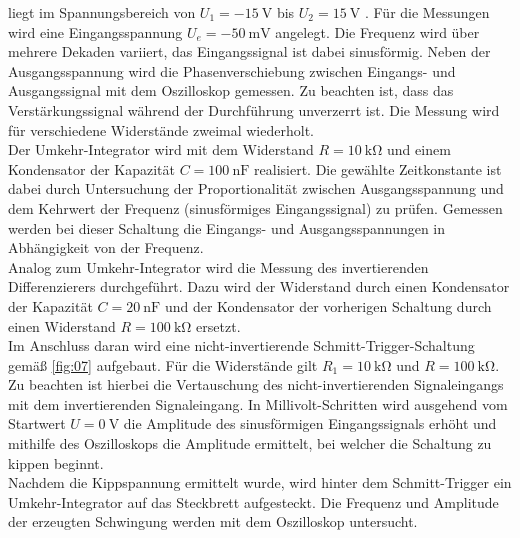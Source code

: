 liegt im Spannungsbereich von $U_1 = -\SI{15}{\volt}$ bis $U_2 = \SI{15}{\volt}$
\cite{datenblatt}. Für die Messungen wird eine Eingangsspannung
$U_e = -\SI{50}{\milli\volt}$ angelegt. Die Frequenz wird über mehrere Dekaden
variiert, das Eingangssignal ist dabei sinusförmig. Neben der Ausgangsspannung
wird die Phasenverschiebung zwischen Eingangs- und Ausgangssignal mit dem
Oszilloskop gemessen. Zu beachten ist, dass das Verstärkungssignal während der
Durchführung unverzerrt ist. Die Messung wird für verschiedene Widerstände
zweimal wiederholt. \\
\noindent Der Umkehr-Integrator wird mit dem Widerstand $R = \SI{10}{\kilo\ohm}$
und einem Kondensator der Kapazität $C = \SI{100}{\nano\farad}$ realisiert.
Die gewählte Zeitkonstante ist dabei durch Untersuchung der Proportionalität
zwischen Ausgangsspannung und dem Kehrwert der Frequenz (sinusförmiges
Eingangssignal) zu prüfen. Gemessen werden bei dieser Schaltung die Eingangs-
und Ausgangsspannungen in Abhängigkeit von der Frequenz. \\
\noindent Analog zum Umkehr-Integrator wird die Messung des invertierenden
Differenzierers durchgeführt. Dazu wird der Widerstand durch einen Kondensator
der Kapazität $C = \SI{20}{\nano\farad}$ und der Kondensator der vorherigen
Schaltung durch einen Widerstand $R = \SI{100}{\kilo\ohm}$ ersetzt. \\
\noindent Im Anschluss daran wird eine nicht-invertierende
Schmitt-Trigger-Schaltung gemäß \autoref{fig:07} aufgebaut. Für die
Widerstände gilt $R_1 = \SI{10}{\kilo\ohm}$ und $R = \SI{100}{\kilo\ohm}$.
Zu beachten ist hierbei die Vertauschung des nicht-invertierenden Signaleingangs
mit dem invertierenden Signaleingang. In Millivolt-Schritten wird ausgehend vom
Startwert $U = \SI{0}{\volt}$ die Amplitude des sinusförmigen Eingangssignals
erhöht und mithilfe des Oszilloskops die Amplitude ermittelt, bei welcher
die Schaltung zu kippen beginnt. \\
\noindent Nachdem die Kippspannung ermittelt wurde, wird hinter dem
Schmitt-Trigger ein Umkehr-Integrator auf das Steckbrett aufgesteckt. Die
Frequenz und Amplitude der erzeugten Schwingung werden mit dem Oszilloskop
untersucht.
